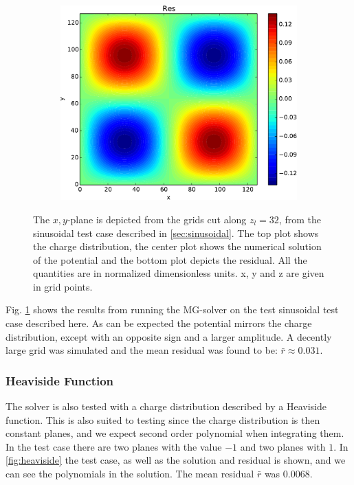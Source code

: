 \begin{figure}
\begin{subfigure}[b]{0.6\textwidth}
				\includegraphics[width = \textwidth]{figures/verification/analytical/sinusoidal/residual.pdf}
			\end{subfigure}
		\caption{The \(x,y\)-plane is depicted from the grids cut along \(z_l = 32\), from the sinusoidal test case described in \cref{sec:sinusoidal}.
		The top plot shows the charge distribution, the center plot shows the numerical solution of the potential and the bottom plot depicts
		the residual. All the quantities are in normalized dimensionless units. x, y and z are given in grid points.}
		\label{fig:sinusoidal}
	\end{figure}

	Fig. \ref{fig:sinusoidal} shows the results from running the MG-solver on the test sinusoidal test case described here.
	As can be expected the potential mirrors the charge distribution, except with an opposite sign and a larger amplitude.
	A decently large grid was simulated and the mean residual was found to be: \(\bar{r} \approx 0.031\).


	\subsubsection{Heaviside Function}
		The solver is also tested with a charge distribution described by a Heaviside
		function. This is also suited to testing since the charge distribution is then
		constant planes, and we expect second order polynomial when integrating them.
		In the test case there are two planes with the value \(-1\) and two
		planes with \(1\). In \cref{fig:heaviside} the test case, as well as the solution and residual is
		shown, and we can see the polynomials in the solution. The mean residual \(\bar{r}\) was
		\(0.0068\).

